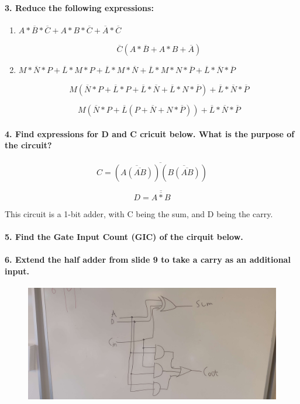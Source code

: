 \paragraph{3. Reduce the following expressions:}

\begin{enumerate}
	\item $A * \overline{B} * \overline{C} + A * B * \overline{C} + \overline{A} * \overline{C}$

	$$\overline{C}(A * \overline{B} + A * B + \overline{A})$$

	\item $M * \overline{N} * P + \overline{L} * M * P + \overline{L} * M * \overline{N} + \overline{L} * M * N * \overline{P} + \overline{L} * \overline{N} * \overline{P}$

	$$M(\overline{N}*P+\overline{L}*P+\overline{L}*\overline{N}+\overline{L}*N*\overline{P})+\overline{L}*\overline{N}*\overline{P}$$

	$$M(\overline{N}*P+\overline{L}(P+\overline{N}+N*\overline{P}))+\overline{L}*\overline{N}*\overline{P}$$
\end{enumerate}

\paragraph{4. Find expressions for D and C cricuit below. What is the purpose of the circuit?}

$$C = \overline{(\overline{A(\overline{AB})})(\overline{B(\overline{AB})})}$$

$$D = \overline{\overline{A*B}}$$

This circuit is a 1-bit adder, with C being the sum, and D being the carry.

\paragraph{5. Find the Gate Input Count (GIC) of the cirquit below.}

\paragraph{6. Extend the half adder from slide 9 to take a carry as an additional input.}

\begin{figure}[H]
	\centering
	\includegraphics[width=\textwidth]{../digitalDesign/fullAdder.png}
\end{figure}
